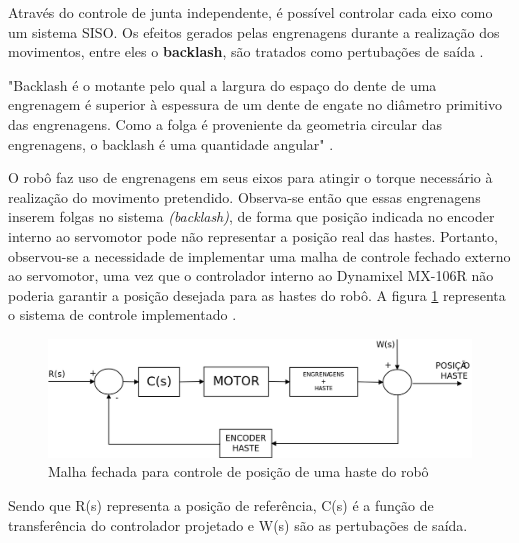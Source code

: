 \documentclass[12pt,oneside,a4paper, chapter=TITLE, section = TITLE, english, brazil]{abntex2}
\begin{document}
Através do controle de junta independente, é possível controlar cada eixo como um sistema SISO. Os efeitos gerados pelas engrenagens durante a realização dos movimentos, entre eles o \textbf{backlash}, são tratados como pertubações de saída \cite{cemig}.

\begin{citacao}
"Backlash é o motante pelo qual a largura do espaço do dente de uma engrenagem é superior à espessura de um dente de engate no diâmetro primitivo das engrenagens. Como a folga é proveniente da geometria circular das engrenagens, o backlash é uma quantidade angular" .
\end{citacao}

O robô faz uso de engrenagens em seus eixos para atingir o torque necessário à realização do movimento pretendido. Observa-se então que essas engrenagens inserem folgas no sistema \textit{(backlash)}, de forma que posição indicada no encoder interno ao servomotor pode não representar a posição real das hastes. Portanto, observou-se a necessidade de implementar uma malha de controle fechado externo ao servomotor, uma vez que o controlador interno ao Dynamixel MX-106R não poderia garantir a posição desejada para as hastes do robô. A figura \ref{fig:malha_fechada} representa o sistema de controle implementado \cite{cemig}.

\begin{figure}[h] %
\centering
\includegraphics[scale=0.4]{./imagens/Malha_fechada}
\caption[Malha fechada para controle de posição de uma haste do robô]{Malha fechada para controle de posição de uma haste do robô \cite{cemig}}
\label{fig:malha_fechada}
\end{figure}

Sendo que R(s) representa a posição de referência, C(s) é a função de transferência do controlador projetado e W(s)  são as pertubações de saída.
\end{document}
